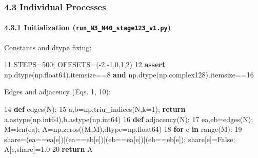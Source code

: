 \documentclass[
  a4paper,
]{ltjsarticle}
\newenvironment{Shaded}{}{}
\newcommand{\BuiltInTok}[1]{\textcolor[rgb]{0.00,0.50,0.00}{#1}}
\newcommand{\ControlFlowTok}[1]{\textcolor[rgb]{0.00,0.44,0.13}{\textbf{#1}}}
\newcommand{\DecValTok}[1]{\textcolor[rgb]{0.25,0.63,0.44}{#1}}
\newcommand{\FloatTok}[1]{\textcolor[rgb]{0.25,0.63,0.44}{#1}}
\newcommand{\KeywordTok}[1]{\textcolor[rgb]{0.00,0.44,0.13}{\textbf{#1}}}
\newcommand{\NormalTok}[1]{#1}
\newcommand{\OperatorTok}[1]{\textcolor[rgb]{0.40,0.40,0.40}{#1}}
\newcommand{\VariableTok}[1]{\textcolor[rgb]{0.10,0.09,0.49}{#1}}
\begin{document}
\subsubsection{4.3 Individual Processes}\label{individual-processes}

\paragraph{\texorpdfstring{4.3.1 Initialization
(\texttt{run\_N3\_N40\_stage123\_v1.py})}{4.3.1 Initialization (run\_N3\_N40\_stage123\_v1.py)}}\label{initialization-run_n3_n40_stage123_v1.py}

Constants and dtype fixing:

\begin{Shaded}
\begin{Highlighting}[]
    \DecValTok{11}\NormalTok{  STEPS}\OperatorTok{=}\DecValTok{500}\OperatorTok{;}\NormalTok{ OFFSETS}\OperatorTok{=}\NormalTok{(}\OperatorTok{{-}}\DecValTok{2}\NormalTok{,}\OperatorTok{{-}}\DecValTok{1}\NormalTok{,}\DecValTok{0}\NormalTok{,}\DecValTok{1}\NormalTok{,}\DecValTok{2}\NormalTok{)}
    \DecValTok{12}  \ControlFlowTok{assert}\NormalTok{ np.dtype(np.float64).itemsize}\OperatorTok{==}\DecValTok{8} \KeywordTok{and}\NormalTok{ np.dtype(np.complex128).itemsize}\OperatorTok{==}\DecValTok{16}
\end{Highlighting}
\end{Shaded}

Edges and adjacency (Eqs. 1, 10):

\begin{Shaded}
\begin{Highlighting}[]
    \DecValTok{14}  \KeywordTok{def}\NormalTok{ edges(N):}
    \DecValTok{15}\NormalTok{      a,b}\OperatorTok{=}\NormalTok{np.triu\_indices(N,k}\OperatorTok{=}\DecValTok{1}\NormalTok{)}\OperatorTok{;} \ControlFlowTok{return}\NormalTok{ a.astype(np.int64),b.astype(np.int64)}
    \DecValTok{16}  \KeywordTok{def}\NormalTok{ adjacency(N):}
    \DecValTok{17}\NormalTok{      ea,eb}\OperatorTok{=}\NormalTok{edges(N)}\OperatorTok{;}\NormalTok{ M}\OperatorTok{=}\BuiltInTok{len}\NormalTok{(ea)}\OperatorTok{;}\NormalTok{ A}\OperatorTok{=}\NormalTok{np.zeros((M,M),dtype}\OperatorTok{=}\NormalTok{np.float64)}
    \DecValTok{18}      \ControlFlowTok{for}\NormalTok{ e }\KeywordTok{in} \BuiltInTok{range}\NormalTok{(M):}
    \DecValTok{19}\NormalTok{          share}\OperatorTok{=}\NormalTok{(ea}\OperatorTok{==}\NormalTok{ea[e])}\OperatorTok{|}\NormalTok{(ea}\OperatorTok{==}\NormalTok{eb[e])}\OperatorTok{|}\NormalTok{(eb}\OperatorTok{==}\NormalTok{ea[e])}\OperatorTok{|}\NormalTok{(eb}\OperatorTok{==}\NormalTok{eb[e])}\OperatorTok{;}\NormalTok{ share[e]}\OperatorTok{=}\VariableTok{False}\OperatorTok{;}\NormalTok{ A[e,share]}\OperatorTok{=}\FloatTok{1.0}
    \DecValTok{20}      \ControlFlowTok{return}\NormalTok{ A}
\end{Highlighting}
\end{Shaded}
\end{document}

